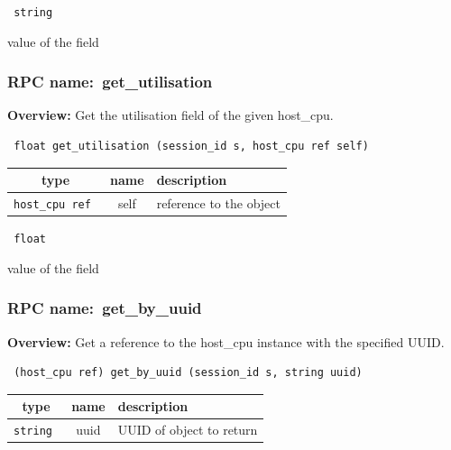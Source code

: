 \vspace{0.3cm}

{\tt 
string
}


value of the field
\vspace{0.3cm}
\vspace{0.3cm}
\vspace{0.3cm}
\subsubsection{RPC name:~get\_utilisation}

{\bf Overview:} 
Get the utilisation field of the given host\_cpu.

\begin{verbatim} float get_utilisation (session_id s, host_cpu ref self)\end{verbatim}



 
\vspace{0.3cm}
\begin{tabular}{|c|c|p{7cm}|}
 \hline
{\bf type} & {\bf name} & {\bf description} \\ \hline
{\tt host\_cpu ref } & self & reference to the object \\ \hline 

\end{tabular}

\vspace{0.3cm}

{\tt 
float
}


value of the field
\vspace{0.3cm}
\vspace{0.3cm}
\vspace{0.3cm}
\subsubsection{RPC name:~get\_by\_uuid}

{\bf Overview:} 
Get a reference to the host\_cpu instance with the specified UUID.

\begin{verbatim} (host_cpu ref) get_by_uuid (session_id s, string uuid)\end{verbatim}



 
\vspace{0.3cm}
\begin{tabular}{|c|c|p{7cm}|}
 \hline
{\bf type} & {\bf name} & {\bf description} \\ \hline
{\tt string } & uuid & UUID of object to return \\ \hline 

\end{tabular}

